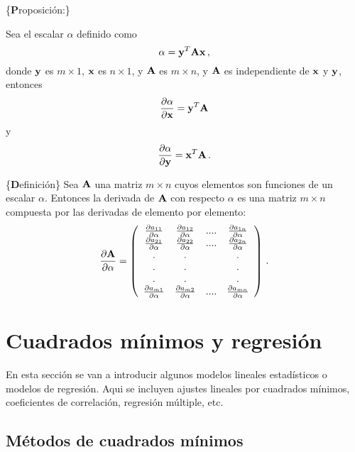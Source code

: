 \documentclass[
]{agujournal2019}
\begin{document}
\vspace{0.5cm}

\{\noindent \textbf Proposición:\}

\noindent Sea el escalar \(\alpha\) definido como
\[\alpha={\textbf y}^T{\textbf A}{\textbf x}\,,\] donde \({\textbf y}\)
es \(m\times 1\), \({\textbf x}\) es \(n\times 1\), y \({\textbf A}\) es
\(m\times n\), y \({\textbf A}\) es independiente de \({\textbf x}\) y
\({\textbf y}\), entonces
\[\frac{\partial{\alpha}}{\partial{{\textbf x}}}={\textbf y}^T{\textbf A}\]
y
\[\frac{\partial{\alpha}}{\partial{{\textbf y}}}={\textbf x}^T{\textbf A}\,.\]

\vspace{0.5cm}

\{\noindent \textbf Definición\} Sea \({\textbf A}\) una matriz
\(m\times n\) cuyos elementos son funciones de un escalar \(\alpha\).
Entonces la derivada de \({\textbf A}\) con respecto \(\alpha\) es una
matriz \(m\times n\) compuesta por las derivadas de elemento por
elemento:
\[\frac{\partial{\textbf A}}{\partial{\alpha}}=\left(\begin{array}{cccc}
  \frac{\partial{a_{11}}}{\partial{\alpha}} & \frac{\partial{a_{12}}}{\partial{\alpha}} & .... &
   \frac{\partial{a_{1n}}}{\partial{\alpha}}\\
  \frac{\partial{a_{21}}}{\partial{\alpha}} & \frac{\partial{a_{22}}}{\partial{\alpha}} & .... &
   \frac{\partial{a_{2n}}}{\partial{\alpha}}\\
    .    &   .    &      &   . \\
    .    &   .    &      &   . \\
    .    &   .    &      &   . \\
  \frac{\partial{a_{m1}}}{\partial{\alpha}} & \frac{\partial{a_{m2}}}{\partial{\alpha}} & .... &
   \frac{\partial{a_{mn}}}{\partial{\alpha}}\\
\end{array}
  \right)
\,.\]

\section{Cuadrados mínimos y
regresión}\label{cuadrados-muxednimos-y-regresiuxf3n}

\noindent En esta sección se van a introducir algunos modelos lineales
estadísticos o modelos de regresión. Aqui se incluyen ajustes lineales
por cuadrados mínimos, coeficientes de correlación, regresión múltiple,
etc.

\subsection{Métodos de cuadrados
mínimos}\label{muxe9todos-de-cuadrados-muxednimos}
\end{document}
